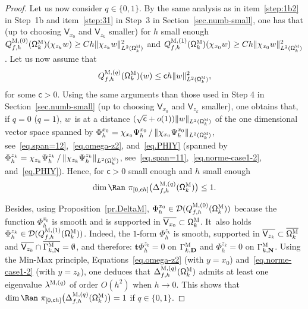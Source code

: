 \documentclass[JEP,XML,SOM,Unicode,NoEqCountersInSection,NoFloatCountersInSection,published]{cedram}
\newcommand{\mbf}[1]{\mathbf{#1}}
\theoremstyle{plain}
\theoremstyle{definition}
\begin{document}
\begin{proof}
Let us now consider $q\in\{0,1\}$. By the same analysis as in
item~\eqref{step:1b2} in Step~1b and item~\eqref{step:31} in Step~3 in
Section~\ref{sec.numb-small}, one has that (up to choosing $\mathsf V_{x_0}$ and $\mathsf V_{z_k}$ smaller) for $h$ small enough
$ Q_{f,h}^{\textsc{M},(0)}(\mathsf \Omega_k^{\textsc{M}})(\chi_{z_k} w)\ge Ch \Vert \chi_{z_k} w \Vert_{L^2(\mathsf \Omega_k^{\textsc{M}})}^2$
and
$ Q_{f,h}^{\textsc{M},(1)}(\mathsf \Omega_k^{\textsc{M}})(\chi_{x_0} w)\ge Ch \Vert \chi_{x_0} w \Vert_{L^2(\mathsf \Omega_k^{\textsc{M}})}^2$.
Let us now assume that
\[
Q_{f,h}^{\textsc{M},(q)}(\mathsf \Omega_k^{\textsc{M}})(w) \le \mathsf ch\Vert w \Vert_{L^2(\mathsf \Omega_k^{\textsc{M}})}^2,
\]
for some $\mathsf c>0$. Using the same arguments than those used in Step 4 in Section~\ref{sec.numb-small} (up to choosing $\mathsf V_{x_0}$ and $\mathsf V_{z_k}$ smaller), one obtains that, if $q=0$ (\resp $q=1$), $w$~is at a distance $(\sqrt {\mathsf c} +o(1))\Vert w \Vert_{L^2(\mathsf \Omega_k^{\textsc{M}})}$ of the one dimensional vector space spanned by $\Phi_h^{x_0}= \chi_{x_0}\Psi_h^{x_0}\, /\, \Vert \chi_{x_0} \Psi_h^{x_0} \Vert_{L^2(\mathsf \Omega_k^{\textsc{M}})}$, see~\eqref{eq.span=12},~\eqref{eq.omega-z2}, and~\eqref{eq.PHIY} (\resp spanned by $\Phi_h^{z_k}=\chi_{z_k}\Psi_h^{z_k}\, /\, \Vert \chi_{z_k} \Psi_h^{z_k} \Vert_{L^2(\mathsf \Omega_k^{\textsc{M}})}$, see~\eqref{eq.span=11},~\eqref{eq.norme-case1-2}, and~\eqref{eq.PHIY}). Hence, for $\mathsf c>0$ small enough and $h$ small enough
\[
\dim\Ran \ \pi_{[0,\mathsf ch ]}\bigl(\Delta_{f,h}^{\textsc{M},(q)}
(\mathsf \Omega_k^{\textsc{M}})\bigr)\le 1.
\]

Besides, using
Proposition~\ref{pr.DeltaM}, $\Phi_h^{x_0}\in \mathcal
D(Q_{f,h}^{\textsc{M},(0)}(\mathsf \Omega_k^{\textsc{M}}))$ because
the function $\Phi_h^{x_0}$ is smooth and is supported in $\overline
{\mathsf V_{x_0}}\subset \mathsf \Omega_k^{\textsc{M}}$. It~also holds
$\Phi_h^{z_k}\in \mathcal D(Q_{f,h}^{\textsc{M},(1)}(\mathsf
\Omega_k^{\textsc{M}}))$. Indeed, the $1$-form $\Phi_h^{z_k}$ is
smooth, supported in $ \overline {\mathsf V_{z_k}} \subset
\overline{\mathsf \Omega_k^{\textsc{M}}}$ and $\overline {\mathsf
V_{z_k}} \cap \overline{\Gamma_{k,\mbf N}^{\textsc{M}}}=\emptyset$,
and therefore: $\mbf t \Phi_h^{z_k}= 0$ on $\Gamma_{k,\mbf
D}^{\textsc{M}}$ and $\Phi_h^{z_k}=0$ on $\Gamma_{k,\mbf
N}^{\textsc{M}}$. Using the Min-Max principle,
Equations~\eqref{eq.omega-z2} (with $y=x_0$)
and~\eqref{eq.norme-case1-2} (with $y=z_k$), one deduces that
$\Delta_{f,h}^{\textsc{M},(q)}(\mathsf \Omega_k^{\textsc{M}})$
admits at least one eigenvalue $\lambda^{\textsc{M}, (q)}$ of order
$O(h^{2})$ when $h\to 0$. This shows that $\dim\Ran \ \pi_{[0,\mathsf ch ]}\bigl(\Delta_{f,h}^{\textsc{M},(q)}
(\mathsf \Omega_k^{\textsc{M}})\bigr)= 1$ if $q \in \{0,1\}$.


\end{proof}
\end{document}
